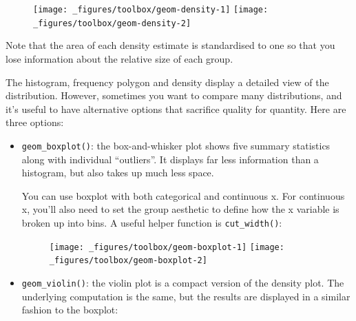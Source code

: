 \begin{figure}[H]
  \texttt{[image: \_figures/toolbox/geom-density-1]}%
  \texttt{[image: \_figures/toolbox/geom-density-2]}
\end{figure}

Note that the area of each density estimate is standardised to one so
that you lose information about the relative size of each group.

The histogram, frequency polygon and density display a detailed view of
the distribution. However, sometimes you want to compare many
distributions, and it's useful to have alternative options that
sacrifice quality for quantity. Here are three options:

\begin{itemize}
\item
  \texttt{geom\_boxplot()}: the box-and-whisker plot shows five summary
  statistics along with individual ``outliers''. It displays far less
  information than a histogram, but also takes up much less space.
   

  You can use boxplot with both categorical and continuous x. For
  continuous x, you'll also need to set the group aesthetic to define
  how the x variable is broken up into bins. A useful helper function is
  \texttt{cut\_width()}: 

\begin{Shaded}
\begin{Highlighting}[]
\StringTok{ }
\StringTok{  }\NormalTok{()}
\StringTok{ }
\StringTok{  }\NormalTok{(}\NormalTok{(} \NormalTok{))) +}\StringTok{ }
\StringTok{  }\NormalTok{(}\NormalTok{, }\NormalTok{)}
\end{Highlighting}
\end{Shaded}

  \begin{figure}[H]
    \texttt{[image: \_figures/toolbox/geom-boxplot-1]}%
    \texttt{[image: \_figures/toolbox/geom-boxplot-2]}
  \end{figure}
\item
  \texttt{geom\_violin()}: the violin plot is a compact version of the
  density plot. The underlying computation is the same, but the results
  are displayed in a similar fashion to the boxplot:
   


\end{itemize}
